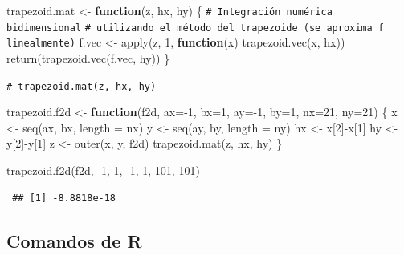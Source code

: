 \documentclass[
  10pt,
]{book}
\newenvironment{Shaded}{\begin{snugshade}}{\end{snugshade}}
\newcommand{\AttributeTok}[1]{\textcolor[rgb]{0.77,0.63,0.00}{#1}}
\newcommand{\CommentTok}[1]{\textcolor[rgb]{0.56,0.35,0.01}{\textit{#1}}}
\newcommand{\ControlFlowTok}[1]{\textcolor[rgb]{0.13,0.29,0.53}{\textbf{#1}}}
\newcommand{\DecValTok}[1]{\textcolor[rgb]{0.00,0.00,0.81}{#1}}
\newcommand{\FunctionTok}[1]{\textcolor[rgb]{0.00,0.00,0.00}{#1}}
\newcommand{\NormalTok}[1]{#1}
\newcommand{\OtherTok}[1]{\textcolor[rgb]{0.56,0.35,0.01}{#1}}
\newcommand{\SpecialCharTok}[1]{\textcolor[rgb]{0.00,0.00,0.00}{#1}}
\theoremstyle{break}
\theoremstyle{nonumberplain}
\renewcommand{\CommentTok}[1]{\textcolor[rgb]{0.41,0.41,0.41}{\texttt{#1}}}
\begin{document}
\begin{Shaded}
\begin{Highlighting}[]
\NormalTok{trapezoid.mat }\OtherTok{\textless{}{-}} \ControlFlowTok{function}\NormalTok{(z, hx, hy) \{ }
\CommentTok{\# Integración numérica bidimensional}
\CommentTok{\# utilizando el método del trapezoide (se aproxima f linealmente)}
\NormalTok{  f.vec }\OtherTok{\textless{}{-}} \FunctionTok{apply}\NormalTok{(z, }\DecValTok{1}\NormalTok{, }\ControlFlowTok{function}\NormalTok{(x) }\FunctionTok{trapezoid.vec}\NormalTok{(x, hx))}
  \FunctionTok{return}\NormalTok{(}\FunctionTok{trapezoid.vec}\NormalTok{(f.vec, hy)) }
\NormalTok{\}}

\CommentTok{\# trapezoid.mat(z, hx, hy) }

\NormalTok{trapezoid.f2d }\OtherTok{\textless{}{-}} \ControlFlowTok{function}\NormalTok{(f2d, }\AttributeTok{ax=}\SpecialCharTok{{-}}\DecValTok{1}\NormalTok{, }\AttributeTok{bx=}\DecValTok{1}\NormalTok{, }\AttributeTok{ay=}\SpecialCharTok{{-}}\DecValTok{1}\NormalTok{, }\AttributeTok{by=}\DecValTok{1}\NormalTok{, }\AttributeTok{nx=}\DecValTok{21}\NormalTok{, }\AttributeTok{ny=}\DecValTok{21}\NormalTok{) \{ }
\NormalTok{  x }\OtherTok{\textless{}{-}} \FunctionTok{seq}\NormalTok{(ax, bx, }\AttributeTok{length =}\NormalTok{ nx)}
\NormalTok{  y }\OtherTok{\textless{}{-}} \FunctionTok{seq}\NormalTok{(ay, by, }\AttributeTok{length =}\NormalTok{ ny)}
\NormalTok{  hx }\OtherTok{\textless{}{-}}\NormalTok{ x[}\DecValTok{2}\NormalTok{]}\SpecialCharTok{{-}}\NormalTok{x[}\DecValTok{1}\NormalTok{]}
\NormalTok{  hy }\OtherTok{\textless{}{-}}\NormalTok{ y[}\DecValTok{2}\NormalTok{]}\SpecialCharTok{{-}}\NormalTok{y[}\DecValTok{1}\NormalTok{]}
\NormalTok{  z }\OtherTok{\textless{}{-}} \FunctionTok{outer}\NormalTok{(x, y, f2d)}
  \FunctionTok{trapezoid.mat}\NormalTok{(z, hx, hy)}
\NormalTok{\}}

\FunctionTok{trapezoid.f2d}\NormalTok{(f2d, }\SpecialCharTok{{-}}\DecValTok{1}\NormalTok{, }\DecValTok{1}\NormalTok{, }\SpecialCharTok{{-}}\DecValTok{1}\NormalTok{, }\DecValTok{1}\NormalTok{, }\DecValTok{101}\NormalTok{, }\DecValTok{101}\NormalTok{) }
\end{Highlighting}
\end{Shaded}

\begin{verbatim}
 ## [1] -8.8818e-18
\end{verbatim}

\hypertarget{comandos-de-r-1}{%
\subsection{Comandos de R}\label{comandos-de-r-1}}
\end{document}
